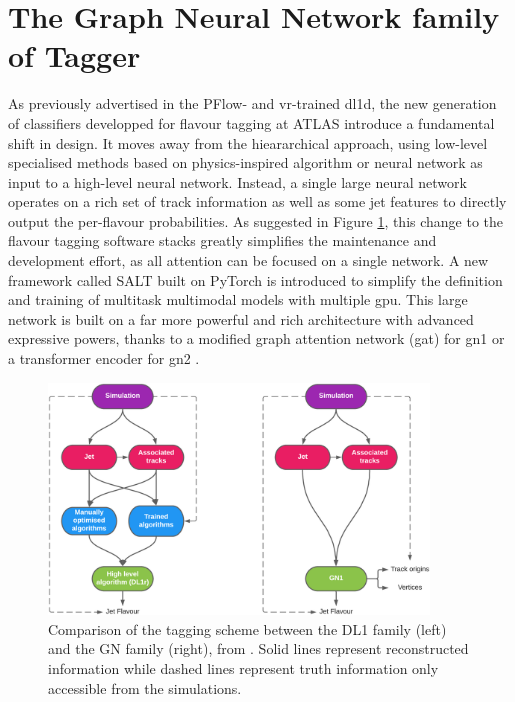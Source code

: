 
\section{The Graph Neural Network family of Tagger}\label{chap:GN}
As previously advertised in the PFlow- and \gls{vr}-trained \gls{dl1d}, the new generation of classifiers developped for flavour tagging at ATLAS introduce a fundamental shift in design. It moves away from the hieararchical approach, using low-level specialised methods based on physics-inspired algorithm or neural network as input to a high-level neural network. Instead, a single large neural network operates on a rich set of track information as well as some jet features to directly output the per-flavour probabilities. As suggested in Figure \ref{fig:ftagArchi}, this change to the flavour tagging software stacks greatly simplifies the maintenance and development effort, as all attention can be focused on a single network. A new framework called \uppercase{Salt} \cite{SaltCite} built on PyTorch \cite{pytorch} is introduced to simplify the definition and training of multitask multimodal models with multiple \gls{gpu}. This large network is built on a far more powerful and rich architecture with advanced expressive powers, thanks to a modified graph attention network (\gls{gat}) \cite{velickovic2018graph, brody2022how} for \gls{gn1} or a transformer encoder for \gls{gn2} \cite{NIPS_transformerPaper}. 

\begin{figure}[h!]
  \center
  \includegraphics[width=0.9\textwidth]{Images/FTAG/GN/Intro/schematics_difference.png}
  \caption{Comparison of the tagging scheme between the DL1 family (left) and the GN family (right), from \cite{ATL-PHYS-PUB-2022-027}. Solid lines represent reconstructed information while dashed lines represent truth information only accessible from the simulations.} 
  \label{fig:ftagArchi}
\end{figure}

